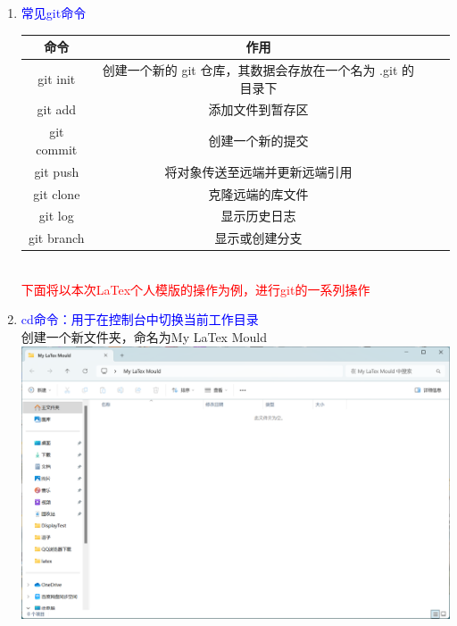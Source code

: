 \documentclass[12pt,a4paper,UTF8]{article}
\begin{document}
\begin{enumerate}
        \item \textcolor{blue}{常见git命令}\\[8pt]
        \begin{tabular}{cccc}
            \toprule
            命令        & 作用 \\
            \midrule
            git init   & 创建一个新的 git 仓库，其数据会存放在一个名为 .git 的目录下 \\
            git add    & 添加文件到暂存区 \\
            git commit & 创建一个新的提交 \\
            git push   & 将对象传送至远端并更新远端引用 \\
            git clone  & 克隆远端的库文件 \\
            git log    & 显示历史日志 \\
            git branch & 显示或创建分支 \\
            \bottomrule
        \end{tabular}\\[8pt]

        \textcolor{red}{下面将以本次LaTex个人模版的操作为例，进行git的一系列操作}
        
        \item \textcolor{blue}{cd命令：用于在控制台中切换当前工作目录}\\
        创建一个新文件夹，命名为My LaTex Mould\\
        \includegraphics[scale=0.25]{pictures/git/14.png}\\


\end{enumerate}
\end{document}
